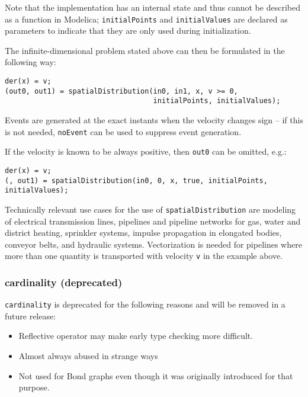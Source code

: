 \begin{nonnormative}
Note that the implementation has an internal state and thus cannot be described as a function in Modelica; \lstinline!initialPoints! and \lstinline!initialValues! are declared as parameters to indicate that they are only used during initialization.

The infinite-dimensional problem stated above can then be formulated in the following way:
\begin{lstlisting}[language=modelica]
der(x) = v;
(out0, out1) = spatialDistribution(in0, in1, x, v >= 0,
                                   initialPoints, initialValues);
\end{lstlisting}

Events are generated at the exact instants when the velocity changes sign -- if this is not needed, \lstinline!noEvent! can be used to suppress event generation.

If the velocity is known to be always positive, then \lstinline!out0! can be omitted, e.g.:
\begin{lstlisting}[language=modelica]
der(x) = v;
(, out1) = spatialDistribution(in0, 0, x, true, initialPoints, initialValues);
\end{lstlisting}
Technically relevant use cases for the use of \lstinline!spatialDistribution! are modeling of electrical transmission lines, pipelines and pipeline networks for gas, water and district heating, sprinkler systems, impulse propagation in elongated bodies, conveyor belts, and hydraulic systems.
Vectorization is needed for pipelines where more than one quantity is transported with velocity \lstinline!v! in the example above.
\end{nonnormative}

\subsubsection{cardinality (deprecated)}\label{cardinality-deprecated}

\begin{nonnormative}
\lstinline!cardinality! is deprecated for the following reasons and will be removed in a future release:
\begin{itemize}
\item
  Reflective operator may make early type checking more difficult.
\item
  Almost always abused in strange ways
\item
  Not used for Bond graphs even though it was originally introduced for that purpose.
\end{itemize}
\end{nonnormative}

